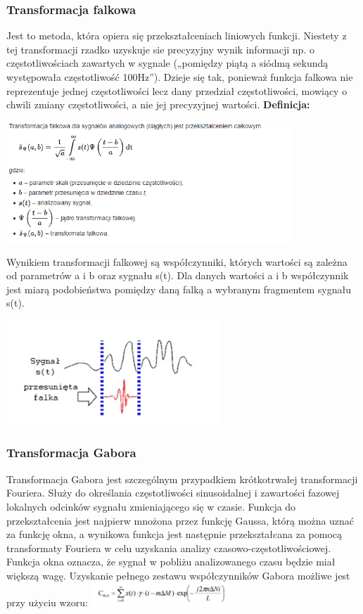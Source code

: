 \documentclass[a4paper,titleauthor]{mwart}
\begin{document}
\subsubsection{Transformacja falkowa}
Jest to metoda, która opiera się przekształceniach liniowych funkcji. Niestety z tej transformacji rzadko uzyskuje sie precyzyjny wynik informacji np. o częstotliwościach zawartych w sygnale („pomiędzy piątą a siódmą sekundą występowała
częstotliwość 100Hz”). Dzieje się tak, ponieważ funkcja falkowa nie reprezentuje jednej częstotliwości lecz dany przedział częstotliwości, mowiący o chwili zmiany częstotliwości, a nie jej precyzyjnej wartości.
\newline \newline
\textbf{Definicja:}\newline

	\includegraphics[width=0.8\textwidth]{falkowa.PNG}

Wynikiem transformacji falkowej są współczynniki, których wartości są zależna od parametrów a i b oraz sygnału s(t). Dla danych wartości a i b współczynnik jest miarą podobieństwa pomiędzy daną falką a wybranym fragmentem sygnału s(t).\newline

	\includegraphics[width=0.6\textwidth]{wynik_falki.PNG}

\subsubsection{Transformacja Gabora}
Transformacja Gabora  jest szczególnym przypadkiem krótkotrwałej transformacji Fouriera. Służy do określania częstotliwości sinusoidalnej i zawartości fazowej lokalnych odcinków sygnału zmieniającego się w czasie. Funkcja do przekształcenia jest najpierw mnożona przez funkcję Gaussa, którą można uznać za funkcję okna, a wynikowa funkcja jest następnie przekształcana za pomocą transformaty Fouriera w celu uzyskania analizy czasowo-częstotliwościowej. Funkcja okna oznacza, że sygnał w pobliżu analizowanego czasu będzie miał większą wagę. 
Uzyskanie pełnego zestawu współczynników Gabora możliwe jest przy użyciu wzoru:\newline
\includegraphics[width=0.4\textwidth]{transG1.png}
\end{document}
